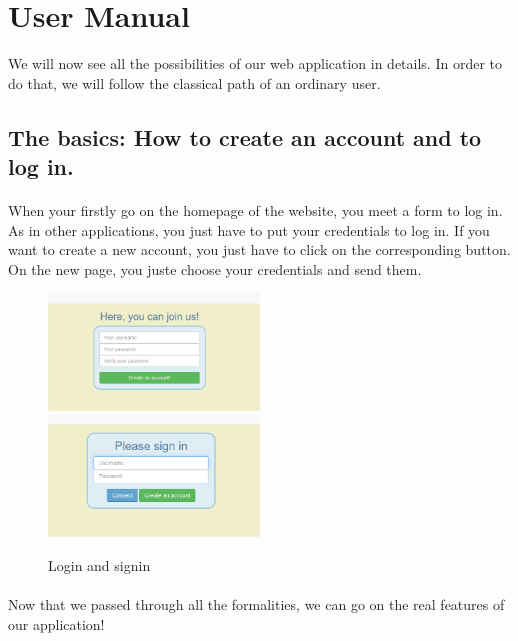 \section{User Manual}

We will now see all the possibilities of our web application in details. In order to do that, we will follow the classical path of an ordinary user.

\subsection{The basics: How to create an account and to log in.}

\paragraph{}
When your firstly go on the homepage of the website, you meet a form to log in. As in other applications, you just have to put your credentials to log in. If you want to create a new account, you just have to click on the corresponding button. On the new page, you juste choose your credentials and send them.

\begin{figure}[H]
    \includegraphics[width=0.5\textwidth]{./images/signin.png}
    \includegraphics[width=0.5\textwidth]{./images/login.png}
    \caption{Login and signin}
\end{figure}

\paragraph{}
Now that we passed through all the formalities, we can go on the real features of our application!

